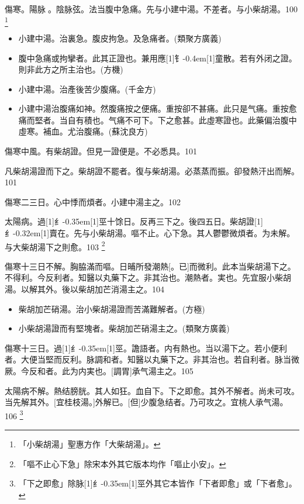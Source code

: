 \documentclass[oneside,b4paper]{ctexbook}
\begin{document}
\begin{flushleft}
傷寒。陽脉{𬈧}。陰脉弦。法当腹中急痛。先与小建中湯。不差者。与小柴胡湯。100
\footnote{「小柴胡湯」聖惠方作「大柴胡湯」。}

\begin{itemize}
\item 小建中湯。治裏急。腹皮拘急。及急痛者。(類聚方廣義)
\item 腹中急痛或拘攣者。此其正證也。兼用應{\hbox{\scalebox{0.7}[1]{钅}\kern-0.4em\scalebox{0.7}[1]{童}}}散。若有外闭之證。則非此方之所主治也。(方機)
\item 小建中湯。治產後苦少腹痛。(千金方)
\item 小建中湯治腹痛如神。然腹痛按之便痛。重按卻不甚痛。此只是气痛。重按愈痛而堅者。当自有積也。气痛不可下。下之愈甚。此虛寒證也。此藥偏治腹中虛寒。補血。尤治腹痛。(蘇沈良方)
\end{itemize}

傷寒中風。有柴胡證。但見一證便是。不必悉具。101

凡柴胡湯證而下之。柴胡證不罷者。復与柴胡湯。必蒸蒸而振。卻發熱汗出而解。101

傷寒二三日。心中悸而煩者。小建中湯主之。102

太陽病。過{\hbox{\scalebox{0.68}[1]{纟}\kern-0.35em\scalebox{0.64}[1]{巠}}}十馀日。反再三下之。後四五日。柴胡證{\hbox{\scalebox{0.6}[1]{纟}\kern-0.32em\scalebox{0.7}[1]{賣}}}在。先与小柴胡湯。嘔不止。心下急。其人鬱鬱微煩者。为未解。与大柴胡湯下之則愈。103
\footnote{「嘔不止心下急」除宋本外其它版本均作「嘔止小安」。}

傷寒十三日不解。胸脇滿而嘔。日晡所發潮熱[。已]而微利。此本当柴胡湯下之。不得利。今反利者。知醫以丸藥下之。非其治也。潮熱者。実也。先宜服小柴胡湯。以解其外。後以柴胡加芒消湯主之。104

\begin{itemize}
\item 柴胡加芒硝湯。治小柴胡湯證而苦滿難解者。(方極)
\item 小柴胡湯證而有堅塊者。柴胡加芒硝湯主之。(類聚方廣義)
\end{itemize}

傷寒十三日。過{\hbox{\scalebox{0.68}[1]{纟}\kern-0.35em\scalebox{0.64}[1]{巠}}}。譫語者。内有熱也。当以湯下之。若小便利者。大便当堅而反利。脉調和者。知醫以丸藥下之。非其治也。若自利者。脉当微厥。今反和者。此为内実也。[調胃]承气湯主之。105

太陽病不解。熱结膀胱。其人如狂。血自下。下之即愈。其外不解者。尚未可攻。当先解其外。[宜桂枝湯。]外解已。[但]少腹急结者。乃可攻之。宜桃人承气湯。106
\footnote{「下之即愈」除脉{\hbox{\scalebox{0.68}[1]{纟}\kern-0.35em\scalebox{0.64}[1]{巠}}}外其它本皆作「下者即愈」或「下者愈」。}


\end{flushleft}
\end{document}
